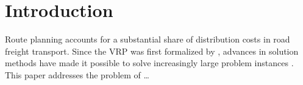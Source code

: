 \documentclass[11pt,a4paper]{article}
\begin{document}
%

\section{Introduction}
\label{sec:introduction}
Route planning accounts for a substantial share of distribution costs in road freight transport. Since the \ac{VRP} was first formalized by \textcite{dantzig1959truck}, advances in solution methods have made it possible to solve increasingly large problem instances \parencite{desaulniers2005column}. This paper addresses the problem of \ldots
\end{document}
